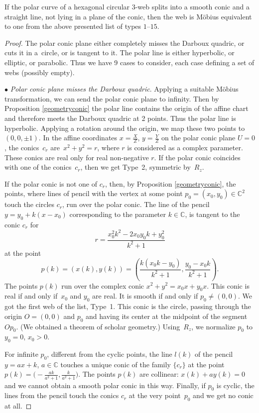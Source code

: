 \begin{Theorem}\label{conicPencil}
If the polar curve of a hexagonal circular $3$-web splits into a smooth conic and a straight line, not lying in a plane of the conic, then the web is M\"obius equivalent to one from the above presented list of types $1$--$15$.
\end{Theorem}
\begin{proof} The polar conic plane either completely misses the Darboux quadric, or cuts it in a~circle, or is tangent to it. The polar line is either hyperbolic, or elliptic, or parabolic. Thus we have 9 cases to consider, each case defining a set of webs (possibly empty).

$\bullet$ {\it Polar conic plane misses the Darboux quadric}.
Applying a suitable M\" obius transformation, we can send the polar conic plane to infinity. Then by Proposition \ref{geometryconic} the polar line contains the origin of the affine chart and therefore meets the Darboux quadric at 2 points. Thus the polar line is hyperbolic. Applying a rotation around the origin, we map these two points to~${(0,0,\pm 1)}$. In the affine coordinates $x=\frac{X}{Z}$, $ y=\frac{Y}{Z}$ on the polar conic plane $U=0$, the conics~$c_r$ are~${
x^2+y^2=r}$,
where $r$ is considered as a complex parameter. These conics are real only for real non-negative $r$.
If the polar conic coincides with one of the conics~$c_r$, then we get Type~2, symmetric by~$R_z$.

If the polar conic is not one of $c_r$, then, by Proposition \ref{geometryconic}, the points, where lines of pencil with the vertex at some point $p_0=(x_0,y_0)\in \mathbb C^2$ touch the circles $c_r$, run over the polar conic. The line of the pencil $y=y_0+k(x-x_0)$ corresponding to the parameter $k\in \mathbb C$, is tangent to the conic $c_r$ for
\[
r=\frac{x_0^2k^2 - 2x_0y_0k + y_0^2}{k^2 + 1}
\]
at the point
\[
p(k)=(x(k),y(k))=\left(\frac{k(x_0k - y_0)}{k^2 + 1},\frac{y_0-x_0k}{k^2 + 1} \right).
\]
The points $p(k)$ run over the complex conic
$
x^2+y^2 =x_0x + y_0x$.
 This conic is real if and only if~$x_0$ and $y_0$ are real. It is smooth if and only if $p_0\ne (0,0)$. We got the first web of the list, Type~1. This conic is the circle, passing through the origin $O=(0,0)$ and $p_0$ and having its center at the midpoint of the segment $Op_0$.
(We obtained a theorem of scholar geometry.) Using~$R_z$, we normalize $p_0$ to $y_0=0$, $x_0>0$.

 For infinite $p_0$, different from the cyclic points, the line $l(k)$ of the pencil $y=ax+k$, $a\in \mathbb C$ touches a unique conic of the family $\{c_r\}$ at the point
$
p(k)=\bigl(-\frac{ak}{a^2 + 1}, \frac{k}{a^2 + 1}\bigr)$.
The points $p(k)$ are collinear: $x(k)+ay(k)=0$ and we cannot obtain a smooth polar conic in this way. Finally, if $p_0$ is cyclic, the lines from the pencil touch the conics $c_r$ at the very point~$p_0$ and we get no conic at all.



\end{proof}
